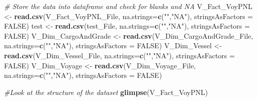 \documentclass[]{article}
\newenvironment{Shaded}{\begin{snugshade}}{\end{snugshade}}
\newcommand{\KeywordTok}[1]{\textcolor[rgb]{0.13,0.29,0.53}{\textbf{#1}}}
\newcommand{\DataTypeTok}[1]{\textcolor[rgb]{0.13,0.29,0.53}{#1}}
\newcommand{\StringTok}[1]{\textcolor[rgb]{0.31,0.60,0.02}{#1}}
\newcommand{\CommentTok}[1]{\textcolor[rgb]{0.56,0.35,0.01}{\textit{#1}}}
\newcommand{\OtherTok}[1]{\textcolor[rgb]{0.56,0.35,0.01}{#1}}
\newcommand{\NormalTok}[1]{#1}
\begin{document}
\begin{Shaded}
\begin{Highlighting}[]
\CommentTok{# Store the data into dataframe and check for blanks and NA}
\NormalTok{V_Fact_VoyPNL <-}\StringTok{ }\KeywordTok{read.csv}\NormalTok{(V_Fact_VoyPNL_File, }\DataTypeTok{na.strings=}\KeywordTok{c}\NormalTok{(}\StringTok{""}\NormalTok{,}\StringTok{"NA"}\NormalTok{), }\DataTypeTok{stringsAsFactors =} \OtherTok{FALSE}\NormalTok{)}
\NormalTok{test <-}\StringTok{ }\KeywordTok{read.csv}\NormalTok{(test_File, }\DataTypeTok{na.strings=}\KeywordTok{c}\NormalTok{(}\StringTok{""}\NormalTok{,}\StringTok{"NA"}\NormalTok{), }\DataTypeTok{stringsAsFactors =} \OtherTok{FALSE}\NormalTok{)}
\NormalTok{V_Dim_CargoAndGrade <-}\StringTok{ }\KeywordTok{read.csv}\NormalTok{(V_Dim_CargoAndGrade_File, }\DataTypeTok{na.strings=}\KeywordTok{c}\NormalTok{(}\StringTok{""}\NormalTok{,}\StringTok{"NA"}\NormalTok{), }\DataTypeTok{stringsAsFactors =} \OtherTok{FALSE}\NormalTok{)}
\NormalTok{V_Dim_Vessel <-}\StringTok{ }\KeywordTok{read.csv}\NormalTok{(V_Dim_Vessel_File, }\DataTypeTok{na.strings=}\KeywordTok{c}\NormalTok{(}\StringTok{""}\NormalTok{,}\StringTok{"NA"}\NormalTok{), }\DataTypeTok{stringsAsFactors =} \OtherTok{FALSE}\NormalTok{)}
\NormalTok{V_Dim_Voyage <-}\StringTok{ }\KeywordTok{read.csv}\NormalTok{(V_Dim_Voyage_File, }\DataTypeTok{na.strings=}\KeywordTok{c}\NormalTok{(}\StringTok{""}\NormalTok{,}\StringTok{"NA"}\NormalTok{), }\DataTypeTok{stringsAsFactors =} \OtherTok{FALSE}\NormalTok{)}
\end{Highlighting}
\end{Shaded}

\begin{Shaded}
\begin{Highlighting}[]
\CommentTok{#Look at the structure of the dataset}
\KeywordTok{glimpse}\NormalTok{(V_Fact_VoyPNL)}
\end{Highlighting}
\end{Shaded}
\end{document}
